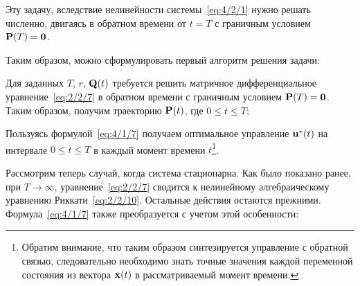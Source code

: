 \eeq

Эту задачу, вследствие нелинейности системы~\ref{eq:4/2/1} нужно решать численно, двигаясь в обратном времени от $t=T$ с граничным условием $\mathbf{P}(T) = \mathbf{0}$.

Таким образом, можно сформулировать первый алгоритм решения задачи:

	\benum
		\item
			Для заданных $T$, $r$, $\mathbf{Q}(t)$ требуется решить матричное дифференциальное уравнение~\ref{eq:2/2/7} в обратном времени с граничным условием $\mathbf{P}(T) = \mathbf{0}$. Таким образом, получим траекторию $\mathbf{P}(t)$, где $0 \leqslant t \leqslant T$;
			
		\item
			Пользуясь формулой~\ref{eq:4/1/7} получаем оптимальное управление $\mathbf{u}^{*}(t)$ на интервале $0 \leqslant t \leqslant T$ в каждый момент времени $t$\footnote{Обратим внимание, что таким образом синтезируется управление с обратной связью, следовательно необходимо знать точные значения каждой переменной состояния из вектора $\mathbf{x}(t)$ в рассматриваемый момент времени.}. 
	\eenum
\ealgo

\br

Рассмотрим теперь случай, когда система стационарна. Как было показано ранее, при $T \to \infty$, уравнение~\vref{eq:2/2/7} сводится к нелинейному алгебраическому уравнению Риккати~\vref{eq:2/2/10}. Остальные действия остаются прежними. Формула~\ref{eq:4/1/7} также преобразуется с учетом этой особенности:

